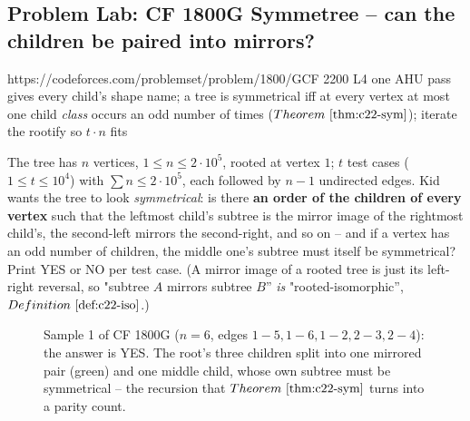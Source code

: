 \subsection{Problem Lab: CF 1800G Symmetree -- can the children be paired into mirrors?}

  {https://codeforces.com/problemset/problem/1800/G}{CF 2200 L4}
  {one AHU pass gives every child's shape name; a tree is symmetrical iff at every vertex at most one child \emph{class} occurs an odd number of times (\(\thmref{c22-sym}\)); iterate the rootify so \(t\cdot n\) fits}

\begin{problemstatement}
The tree has \(n\) vertices, \(1\le n\le 2\cdot10^{5}\), rooted at vertex \(1\);
\(t\) test cases (\(1\le t\le10^{4}\)) with \(\sum n\le 2\cdot10^{5}\), each
followed by \(n-1\) undirected edges.  Kid wants the tree to look
\emph{symmetrical}: is there \textbf{an order of the children of every vertex}
such that the leftmost child's subtree is the mirror image of the rightmost
child's, the second-left mirrors the second-right, and so on -- and if a vertex
has an odd number of children, the middle one's subtree must itself be
symmetrical?  Print YES or NO per test case.  (A mirror image of a rooted tree is
just its left-right reversal, so "subtree \(A\) mirrors subtree \(B\)'' \emph{is}
"rooted-isomorphic'', \(\defref{c22-iso}\).)
\end{problemstatement}

\begin{figure}[H]
\centering
{}
\caption{Sample 1 of CF 1800G (\(n=6\), edges \(1\!-\!5,1\!-\!6,1\!-\!2,2\!-\!3,
2\!-\!4\)): the answer is YES.  The root's three children split into one mirrored
pair (green) and one middle child, whose own subtree must be symmetrical -- the
recursion that \(\thmref{c22-sym}\) turns into a parity count.}
\label{fig:c22-symmetree}
\end{figure}

